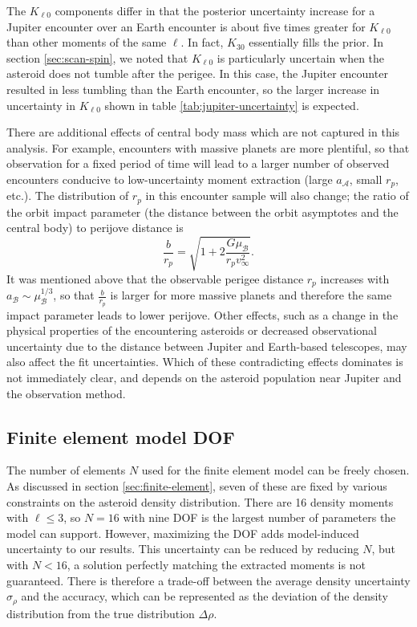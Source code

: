 \documentclass[fleqn,usenatbib]{mnras}
\begin{document}
The $K_{\ell 0}$ components differ in that the posterior uncertainty increase for a Jupiter encounter over an Earth encounter is about five times greater for $K_{\ell 0}$ than other moments of the same $\ell$. In fact, $K_{30}$ essentially fills the prior. In section \ref{sec:scan-spin}, we noted that $K_{\ell 0}$ is particularly uncertain when the asteroid does not tumble after the perigee. In this case, the Jupiter encounter resulted in less tumbling than the Earth encounter, so the larger increase in uncertainty in $K_{\ell 0}$ shown in table \ref{tab:jupiter-uncertainty} is expected.

There are additional effects of central body mass which are not captured in this analysis. For example, encounters with massive planets are more plentiful, so that observation for a fixed period of time will lead to a larger number of observed encounters conducive to low-uncertainty moment extraction (large $a_\mathcal{A}$, small $r_p$, etc.). The distribution of $r_p$ in this encounter sample will also change; the ratio of the orbit impact parameter (the distance between the orbit asymptotes and the central body) to perijove distance is 
\begin{equation}
  \frac{b}{r_p} = \sqrt{1+2\frac{G\mu_\mathcal{B}}{r_p v_\infty^2}}.
\end{equation}
It was mentioned above that the observable perigee distance $r_p$ increases with $a_\mathcal{B} \sim \mu_\mathcal{B}^{1/3}$, so that $\frac{b}{r_p}$ is larger for more massive planets and therefore the same impact parameter leads to lower perijove. Other effects, such as a change in the physical properties of the encountering asteroids or decreased observational uncertainty due to the distance between Jupiter and Earth-based telescopes, may also affect the fit uncertainties. Which of these contradicting effects dominates is not immediately clear, and depends on the asteroid population near Jupiter and the observation method.



\subsection{Finite element model DOF}
\label{sec:dof-scan}
The number of elements $N$ used for the finite element model can be freely chosen. As discussed in section \ref{sec:finite-element}, seven of these are fixed by various constraints on the asteroid density distribution. There are 16 density moments with $\ell \leq 3$, so $N=16$ with nine DOF is the largest number of parameters the model can support. However, maximizing the DOF adds model-induced uncertainty to our results. This uncertainty can be reduced by reducing $N$, but with $N < 16$, a solution perfectly matching the extracted moments is not guaranteed. There is therefore a trade-off between the average density uncertainty $\sigma_\rho$ and the accuracy, which can be represented as the deviation of the density distribution from the true distribution $\Delta \rho$.
\end{document}
